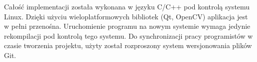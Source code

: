 \documentclass[a4paper,12pt]{article}
\begin{document}
Całość implementacji została wykonana w języku C/C++ pod kontrolą systemu Linux. Dzięki użyciu wieloplatformowych bibliotek (Qt, OpenCV) aplikacja jest w pełni przenośna. Uruchomienie programu na nowym systemie wymaga jedynie rekompilacji pod kontrolą tego systemu. Do synchronizacji pracy programistów w czasie tworzenia projektu, użyty został rozproszony system wersjonowania plików Git. 
%


{}
\end{document}
